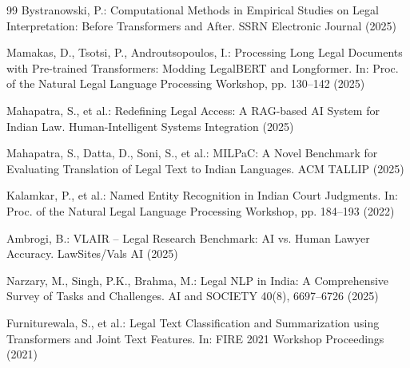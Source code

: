 \documentclass{llncs}
\begin{document}
\begin{thebibliography}{99}
Bystranowski, P.: Computational Methods in Empirical Studies on Legal Interpretation: Before Transformers and After. SSRN Electronic Journal (2025)

Mamakas, D., Tsotsi, P., Androutsopoulos, I.: Processing Long Legal Documents with Pre-trained Transformers: Modding LegalBERT and Longformer. In: Proc. of the Natural Legal Language Processing Workshop, pp. 130--142 (2025)

Mahapatra, S., et al.: Redefining Legal Access: A RAG-based AI System for Indian Law. Human-Intelligent Systems Integration (2025)

Mahapatra, S., Datta, D., Soni, S., et al.: MILPaC: A Novel Benchmark for Evaluating Translation of Legal Text to Indian Languages. ACM TALLIP (2025)

Kalamkar, P., et al.: Named Entity Recognition in Indian Court Judgments. In: Proc. of the Natural Legal Language Processing Workshop, pp. 184--193 (2022)

Ambrogi, B.: VLAIR – Legal Research Benchmark: AI vs. Human Lawyer Accuracy. LawSites/Vals AI (2025)

Narzary, M., Singh, P.K., Brahma, M.: Legal NLP in India: A Comprehensive Survey of Tasks and Challenges. AI and SOCIETY 40(8), 6697--6726 (2025)

Furniturewala, S., et al.: Legal Text Classification and Summarization using Transformers and Joint Text Features. In: FIRE 2021 Workshop Proceedings (2021)

\end{thebibliography}
\end{document}
